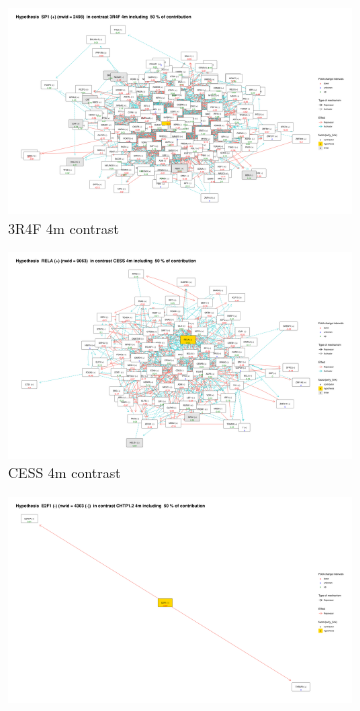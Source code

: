 \begin{figure}
    \begin{subfigure}{0.3\linewidth}
        \includegraphics[width=\textwidth, height=\textheight, keepaspectratio]{Major Thesis/figures/iut/graph/3R4F4m50-SP1.png}
            \caption{3R4F 4m contrast}
            \label{img:smoke}
    \end{subfigure}
    \hfill
    \begin{subfigure}{0.3\linewidth}
        \includegraphics[width=\textwidth, height=\textheight, keepaspectratio]{Major Thesis/figures/iut/graph/CESS4m50-RELA.png}
            \caption{CESS 4m contrast}
            \label{img:prev-smoke}
    \end{subfigure}
    \hfill
    \begin{subfigure}{0.3\linewidth}
        \centering
        \includegraphics[width=\textwidth, height=\textheight, keepaspectratio]{Major Thesis/figures/iut/graph/CHTP4m-E2F1.png}

\end{subfigure}
\end{figure}
